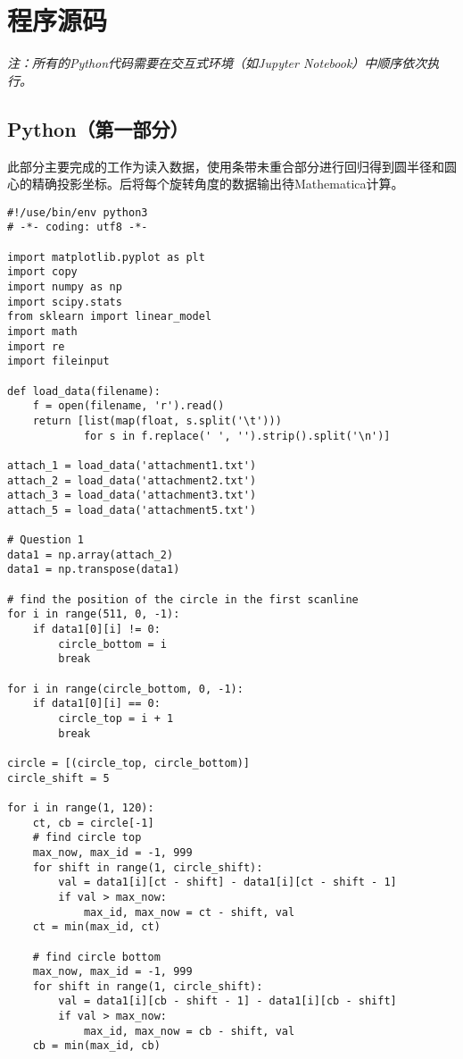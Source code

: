 \section{程序源码}

\emph{注：所有的Python代码需要在交互式环境（如Jupyter Notebook）中顺序依次执行。}

\subsection{Python（第一部分）}
此部分主要完成的工作为读入数据，使用条带未重合部分进行回归得到圆半径和圆心的精确投影坐标。后将每个旋转角度的数据输出待Mathematica计算。

\begin{verbatim}
#!/use/bin/env python3
# -*- coding: utf8 -*-

import matplotlib.pyplot as plt
import copy
import numpy as np
import scipy.stats
from sklearn import linear_model
import math
import re
import fileinput

def load_data(filename):
    f = open(filename, 'r').read()
    return [list(map(float, s.split('\t')))
            for s in f.replace(' ', '').strip().split('\n')]

attach_1 = load_data('attachment1.txt')
attach_2 = load_data('attachment2.txt')
attach_3 = load_data('attachment3.txt')
attach_5 = load_data('attachment5.txt')

# Question 1
data1 = np.array(attach_2)
data1 = np.transpose(data1)

# find the position of the circle in the first scanline
for i in range(511, 0, -1):
    if data1[0][i] != 0:
        circle_bottom = i
        break

for i in range(circle_bottom, 0, -1):
    if data1[0][i] == 0:
        circle_top = i + 1
        break

circle = [(circle_top, circle_bottom)]
circle_shift = 5

for i in range(1, 120):
    ct, cb = circle[-1]
    # find circle top
    max_now, max_id = -1, 999
    for shift in range(1, circle_shift):
        val = data1[i][ct - shift] - data1[i][ct - shift - 1]
        if val > max_now:
            max_id, max_now = ct - shift, val
    ct = min(max_id, ct)

    # find circle bottom
    max_now, max_id = -1, 999
    for shift in range(1, circle_shift):
        val = data1[i][cb - shift - 1] - data1[i][cb - shift]
        if val > max_now:
            max_id, max_now = cb - shift, val
    cb = min(max_id, cb)


\end{verbatim}
